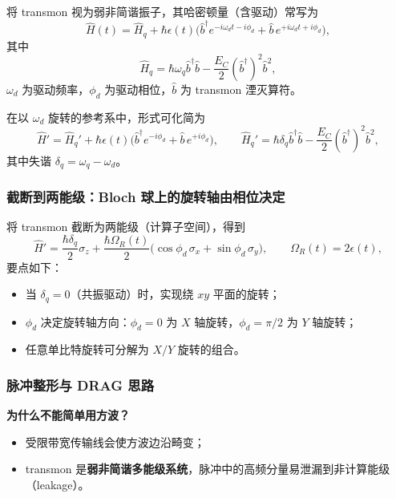 \documentclass[12pt,a4paper,oneside]{ctexbook}
\begin{document}
将 transmon 视为弱非简谐振子，其哈密顿量（含驱动）常写为
\begin{equation}
  \hat H(t)=\hat H_q + \hbar \epsilon(t)\Big(\hat b^\dagger e^{-i\omega_d t-i\phi_d}+\hat b\, e^{+i\omega_d t+i\phi_d}\Big),
  \label{eq:Hlab}
\end{equation}
其中
\[
  \hat H_q=\hbar\omega_q \hat b^\dagger \hat b-\frac{E_C}{2}(\hat b^\dagger)^2\hat b^2,
\]
$\omega_d$ 为驱动频率，$\phi_d$ 为驱动相位，$\hat b$ 为 transmon 湮灭算符。

在以 $\omega_d$ 旋转的参考系中，形式可化简为
\begin{equation}
  \hat H'=\hat H_q' + \hbar \epsilon(t)\Big(\hat b^\dagger e^{-i\phi_d}+\hat b\, e^{+i\phi_d}\Big),
  \qquad
  \hat H_q'=\hbar\delta_q \hat b^\dagger \hat b-\frac{E_C}{2}(\hat b^\dagger)^2\hat b^2,
  \label{eq:Hrot}
\end{equation}
其中失谐 $\delta_q=\omega_q-\omega_d$。

\subsubsection{截断到两能级：Bloch 球上的旋转轴由相位决定}

将 transmon 截断为两能级（计算子空间），得到
\begin{equation}
  \hat H'=\frac{\hbar\delta_q}{2}\sigma_z+\frac{\hbar\Omega_R(t)}{2}\Big(\cos\phi_d\,\sigma_x+\sin\phi_d\,\sigma_y\Big),
  \qquad \Omega_R(t)=2\epsilon(t),
  \label{eq:twolevel}
\end{equation}
要点如下：
\begin{itemize}
  \item 当 $\delta_q=0$（共振驱动）时，实现绕 $xy$ 平面的旋转；
  \item $\phi_d$ 决定旋转轴方向：$\phi_d=0$ 为 $X$ 轴旋转，$\phi_d=\pi/2$ 为 $Y$ 轴旋转；
  \item 任意单比特旋转可分解为 $X/Y$ 旋转的组合。
\end{itemize}

\subsubsection{脉冲整形与 DRAG 思路}

\noindent\textbf{为什么不能简单用方波？}

\begin{itemize}
  \item 受限带宽传输线会使方波边沿畸变；
  \item transmon 是\textbf{弱非简谐多能级系统}，脉冲中的高频分量易泄漏到非计算能级（leakage）。
\end{itemize}
\end{document}
